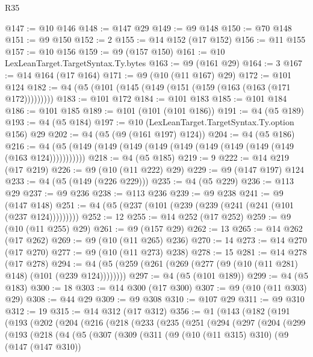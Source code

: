 \begin{lexlean}{R35}
\begin{coremodule}
{{{{{{{{{{{{{{{{{{{{{{{{{{{{{{{{{{{{{{{{{{{{{{{{{{{{@147 := @10 @146
@148 := @147 @29
@149 := @9 @148
@150 := @70 @148
@151 := @9 @150
@152 := 2
@155 := @14 @152 (@17 @152)
@156 := @11 @155
@157 := @10 @156
@159 := @9 (@157 @150)
@161 := @10 LexLeanTarget.TargetSyntax.Ty.bytes
@163 := @9 (@161 @29)
@164 := 3
@167 := @14 @164 (@17 @164)
@171 := @9 (@10 (@11 @167) @29)
@172 := @101 @124
@182 := @4 (@5 (@101 (@145 (@149 (@151 (@159 (@163 (@163 (@171 @172)))))))))
@183 := @101 @172
@184 := @101 @183
@185 := @101 @184
@186 := @101 @185
@189 := @101 (@101 (@101 @186))
@191 := @4 (@5 @189)
@193 := @4 (@5 @184)
@197 := @10 (LexLeanTarget.TargetSyntax.Ty.option @156) @29
@202 := @4 (@5 (@9 (@161 @197) @124))
@204 := @4 (@5 @186)
@216 := @4 (@5 (@149 (@149 (@149 (@149 (@149 (@149 (@149 (@149 (@149 (@163 @124)))))))))))
@218 := @4 (@5 @185)
@219 := 9
@222 := @14 @219 (@17 @219)
@226 := @9 (@10 (@11 @222) @29)
@229 := @9 (@147 @197) @124
@233 := @4 (@5 (@149 (@226 @229)))
@235 := @4 (@5 @229)
@236 := @113 @29
@237 := @9 @236
@238 := @113 @236
@239 := @9 @238
@241 := @9 (@147 @148)
@251 := @4 (@5 (@237 (@101 (@239 (@239 (@241 (@241 (@101 (@237 @124)))))))))
@252 := 12
@255 := @14 @252 (@17 @252)
@259 := @9 (@10 (@11 @255) @29)
@261 := @9 (@157 @29)
@262 := 13
@265 := @14 @262 (@17 @262)
@269 := @9 (@10 (@11 @265) @236)
@270 := 14
@273 := @14 @270 (@17 @270)
@277 := @9 (@10 (@11 @273) @238)
@278 := 15
@281 := @14 @278 (@17 @278)
@294 := @4 (@5 (@259 (@261 (@269 (@277 (@9 (@10 (@11 @281) @148) (@101 (@239 @124))))))))
@297 := @4 (@5 (@101 @189))
@299 := @4 (@5 @183)
@300 := 18
@303 := @14 @300 (@17 @300)
@307 := @9 (@10 (@11 @303) @29)
@308 := @44 @29
@309 := @9 @308
@310 := @107 @29
@311 := @9 @310
@312 := 19
@315 := @14 @312 (@17 @312)
@356 := @1
    (@143
      (@182
        (@191
          (@193
            (@202
              (@204
                (@216
                  (@218
                    (@233
                      (@235
                        (@251
                          (@294
                            (@297
                              (@204
                                (@299
                                  (@193
                                    (@218
                                      (@4
                                        (@5
                                          (@307
                                            (@309
                                              (@311
                                                (@9
                                                  (@10 (@11 @315) @310)
                                                  (@9
                                                    (@147 (@147 @310))
}}}}}}}}}}}}}}}}}}}}}}}}}}}}}}}}}}}}}}}}}}}}}}}}}}}}
\end{coremodule}
\end{lexlean}
